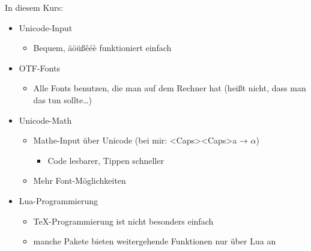 \begin{frame}[fragile]{In diesem Kurs: \LuaTeX}
  \begin{itemize}
    \item Unicode-Input
      \begin{itemize}
        \item Bequem, äöüßêéè funktioniert einfach
      \end{itemize}
    \item OTF-Fonts
      \begin{itemize}
        \item Alle Fonts benutzen, die man auf dem Rechner hat (heißt nicht, dass man das tun sollte…)
      \end{itemize}
    \item Unicode-Math
      \begin{itemize}
        \item Mathe-Input über Unicode (bei mir: <Caps><Caps>a → $α$)
          \begin{itemize}
            \item Code lesbarer, Tippen schneller
            \end{itemize}
        \item Mehr Font-Möglichkeiten
      \end{itemize}
    \item Lua-Programmierung
      \begin{itemize}
        \item \TeX-Programmierung ist nicht besonders einfach
        \item manche Pakete bieten weitergehende Funktionen nur über Lua an
      \end{itemize}
  \end{itemize}
\end{frame}
